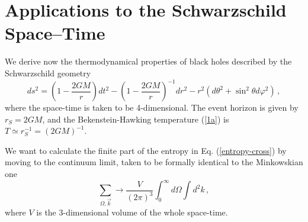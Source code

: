 \section{Applications to the Schwarzschild Space--Time}
\setcounter{equation}{0}

\noindent We derive now the thermodynamical properties of black holes
described by the Schwarzschild geometry
 \begin{equation}
 ds^2=\left( 1-\frac{2GM}{r} \right) dt^2-
 \left( 1-\frac{2GM}{r} \right)^{-1}dr^2 -
 r^2(d\theta^2+\sin^2\theta d\varphi^2)\,,
 \label{SCHW}
 \end{equation}
where the space-time is taken to be 4-dimensional. The event
horizon is given by $r_S = 2GM$, and the Bekenstein-Hawking
temperature (\ref{1a}) is $T \simeq r^{-1}_S = (2GM)^{-1}$.

\noindent We want to calculate the finite part of the entropy in
Eq. (\ref{entropy-cross}) by moving to the continuum limit, taken
to be formally identical to the Minkowskian one
 \begin{equation}\label{continuum}
\sum_{\Omega, \vec k} \to \frac{V}{(2\pi)^3}\int_0^\infty
d\Omega\int d^2 k\,,
 \end{equation}
where $V$ is the 3-dimensional volume of the whole space-time.

